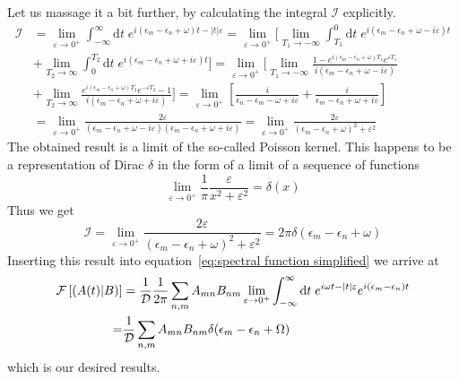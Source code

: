 Let us massage it a bit further, by calculating the integral \(\mathcal{I}\) explicitly.
\begin{align}
    \mathcal{I} & = \lim _{\varepsilon \to 0^+} \int_{-\infty}^{\infty} \mathrm{d} t \;
    e^{ i (\epsilon_m-\epsilon_n+\omega)t -|t| \varepsilon} = \lim _{\varepsilon \to 0^+}
    \Bigg[\lim_{T_1\to -\infty}\int_{T_1}^{0} \mathrm{d} t \; e^{ i (\epsilon_m-\epsilon_n+\omega -i \varepsilon)t}\nonumber         \\
                & +\lim_{T_2\to \infty}\int_{0}^{T_2} \mathrm{d} t \;  e^{ i (\epsilon_m-\epsilon_n+\omega + i\varepsilon)t}\Bigg]
    = \lim _{\varepsilon \to 0^+} \Bigg[\lim_{T_1\to -\infty}
    \frac{1-e^{ i (\epsilon_m-\epsilon_n+\omega )T_1} e^{\varepsilon T_1}}{i (\epsilon_m-\epsilon_n+\omega -i \varepsilon)}\nonumber \\
                & + \lim_{T_2\to \infty} \frac{e^{ i (\epsilon_m-\epsilon_n+\omega )T_2} e^{-\varepsilon T_2}-1}
    {i (\epsilon_m-\epsilon_n+\omega +i \varepsilon)}\Bigg]
    = \lim _{\varepsilon \to 0^+} \left[\frac{i}{\epsilon_n-\epsilon_m-\omega +i \varepsilon} +
    \frac{i}{\epsilon_m-\epsilon_n+\omega +i \varepsilon} \right]\nonumber                                                           \\
                & = \lim _{\varepsilon \to 0^+}
    \frac{2\varepsilon}{(\epsilon_m-\epsilon_n+\omega -i \varepsilon)(\epsilon_m-\epsilon_n+\omega +i \varepsilon)}
    =\lim _{\varepsilon \to 0^+} \frac{2\varepsilon}{(\epsilon_m-\epsilon_n+\omega)^2 +\varepsilon^2}
\end{align}
The obtained result is a limit of the so-called Poisson kernel. This happens to be
a representation of Dirac \(\delta\) in the form of a limit of a sequence of functions~\autocite{Byron1992}
\begin{equation}
    \lim _{\varepsilon \to 0^+} \frac{1}{\pi} \frac{\varepsilon}{x^2 +\varepsilon^2} = \delta(x)
\end{equation}
Thus we get
\begin{equation}
    \mathcal{I} = \lim _{\varepsilon \to 0^+} \frac{2\varepsilon}{(\epsilon_m-\epsilon_n+\omega)^2 +\varepsilon^2}
    = 2\pi \delta(\epsilon_m-\epsilon_n+\omega)
\end{equation}
Inserting this result into equation~\eqref{eq:spectral function simplified} we arrive at
\begin{align}
    \mathcal{F}\left[\left(A(t) \middle| B\right)\right] & = \frac{1}{\mathcal{D}} \frac{1}{2 \pi}\sum_{n,m} A_{mn} B_{nm}
    \lim _{\varepsilon \to 0^+} \int_{-\infty}^{\infty} \mathrm{d} t \; e^{i \omega t-|t|
    \varepsilon}e^{i (\epsilon_m-\epsilon_n) t} \nonumber                                                                    \\
    =                                    & \frac{1}{\mathcal{D}}\sum_{n,m} A_{mn} B_{nm} \delta(\epsilon_m-\epsilon_n+\Omega)
\end{align}
which is our desired results.

